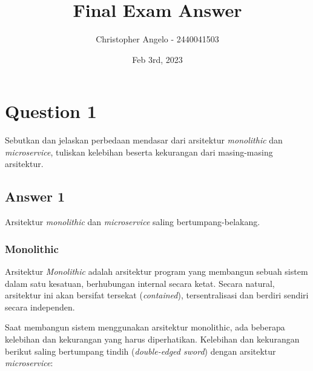 \documentclass[
	11pt, %
	indonesian
]{assignment}
\author{Christopher Angelo - 2440041503}
\institute{BINUS University\\ Global Class}
\date{Feb 3rd, 2023}
\title{Final Exam Answer}
\begin{document}
\maketitle


\section*{Question 1}

\begin{problem}
Sebutkan dan jelaskan perbedaan mendasar dari arsitektur \textit{monolithic} dan \textit{microservice}, tuliskan kelebihan beserta kekurangan dari masing-masing arsitektur.
\end{problem}

\subsection*{Answer 1}

Arsitektur \textit{monolithic} dan \textit{microservice} saling bertumpang-belakang.

\subsubsection*{Monolithic}

Arsitektur \textit{Monolithic} adalah arsitektur program yang membangun sebuah sistem dalam satu kesatuan, berhubungan internal secara ketat. Secara natural, arsitektur ini akan bersifat tersekat (\textit{contained}), tersentralisasi dan berdiri sendiri secara independen.

Saat membangun sistem menggunakan arsitektur monolithic, ada beberapa kelebihan dan kekurangan yang harus diperhatikan. Kelebihan dan kekurangan berikut saling bertumpang tindih (\textit{double-edged sword}) dengan arsitektur \textit{microservice}:
\end{document}
